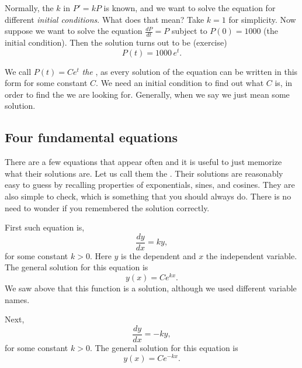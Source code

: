 Normally, the $k$ in $P' = kP$ is known,
and we want to solve
the equation for different \emph{initial conditions}.
What does that mean?
Take $k=1$ for simplicity.  Now suppose we want to solve the equation
$\frac{dP}{dt} = P$ 
subject to $P(0) = 1000$ (the initial condition).
Then the solution turns out to be (exercise)
\begin{equation*}
P(t) = 1000 \, e^t .
\end{equation*}

We call $P(t) = C e^t$ \emph{the },
as every solution
of the equation can be written in this form for some constant $C$.  We
need an initial condition to find out what $C$ is, in order to find the
\emph{} we are looking for.  Generally, when we say
 we just mean some solution.

\subsection{Four fundamental equations} \label{subsection:fourfundamental}

There are a few equations that appear often and
it is useful to just memorize what
their solutions are.
Let us call them the .
Their solutions
are reasonably easy
to guess by recalling properties of exponentials, sines, and cosines.
They are also simple to check, which is something that you should always do.
There is no need to wonder if you remembered the solution correctly.

\medskip

First such equation is,
\begin{equation*}
\frac{dy}{dx} = k y ,
\end{equation*}
for some constant $k > 0$.
Here $y$ is the dependent and $x$ the independent variable.
The general solution for this equation is
\begin{equation*}
y(x) = C e^{kx} .
\end{equation*}
We saw above that this function is a solution, although we used different
variable names.

\medskip

Next,
\begin{equation*}
\frac{dy}{dx} = -k y ,
\end{equation*}
for some constant $k > 0$.
The general solution for this equation is
\begin{equation*}
y(x) = C e^{-kx} .
\end{equation*}

